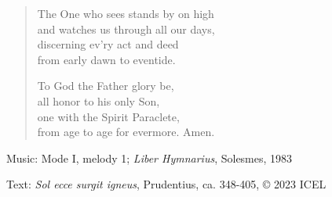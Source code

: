 \hymn



\setlength{\leftmargini}{2em}
\begin{verse}
The One who sees stands by on high\\
and watches us through all our days,\\
discerning ev’ry act and deed\\
from early dawn to eventide.

To God the Father glory be,\\
all honor to his only Son,\\
one with the Spirit Paraclete,\\
from age to age for evermore. Amen.
\end{verse}

\begin{hymnsource}
Music: Mode I, melody 1; \emph{Liber Hymnarius}, Solesmes, 1983

Text: \emph{Sol ecce surgit igneus}, Prudentius, ca. 348-405, © 2023 ICEL
\end{hymnsource}
